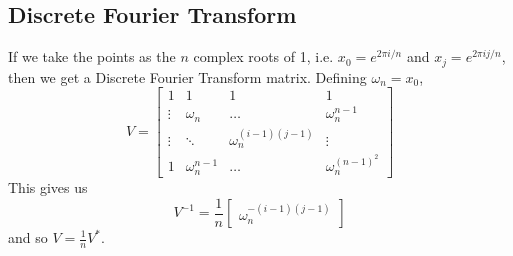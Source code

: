 \documentclass[12pt, openany]{report}
\theoremstyle{definition}
\begin{document}
\subsection{Discrete Fourier Transform}
If we take the points as the $n$ complex roots of 1, i.e. $x_0 = e^{2\pi i/n}$ and $x_j = e^{2\pi ij/n}$, then we get a Discrete Fourier Transform matrix. Defining $\omega_n = x_0$,
\begin{equation}
	V = \begin{bmatrix}
			1 & 1 & 1 & 1 \\
			\vdots & \omega_n & \dots & \omega_n^{n-1}\\
			\vdots & \ddots & \omega_n^{(i-1)(j-1)} & \vdots \\
			1 & \omega_n ^{n-1} & \dots & \omega_n^{(n-1)^2}
		\end{bmatrix}
\end{equation}
This gives us 
\begin{equation}
	V^{-1} = \frac{1}{n} \begin{bmatrix}
		\omega_n^{-(i-1)(j-1)}
	\end{bmatrix}
\end{equation}
and so $V = \frac{1}{n}V^*$.
\end{document}
